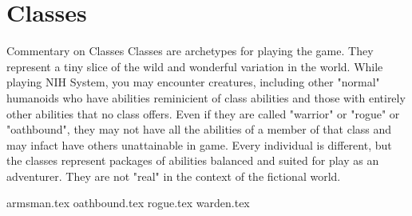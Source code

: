 \chapter{Classes}
\label{ch:classes}

\begin{DndComment}{Commentary on Classes}
Classes are archetypes for playing the game. They represent a tiny slice of the wild and wonderful variation in the world. While playing NIH System, you may encounter creatures, including other "normal" humanoids who have abilities reminicient of class abilities and those with entirely other abilities that no class offers. Even if they are called "warrior" or "rogue" or "oathbound", they may not have all the abilities of a member of that class and may infact have others unattainable in game. Every individual is different, but the classes represent packages of abilities balanced and suited for play as an adventurer. They are not "real" in the context of the fictional world.
\end{DndComment}

{armsman.tex}
{oathbound.tex}
{rogue.tex}
{warden.tex}